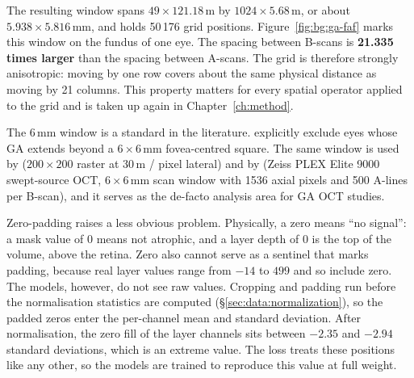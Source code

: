 The resulting window spans $49 \times 121.18$\,\textmu{}m by
$1024 \times 5.68$\,\textmu{}m, or about $5.938 \times 5.816$\,mm, and holds
50\,176 grid positions. Figure~\ref{fig:bg:ga-faf} marks this window on
the fundus of one eye. The spacing between B-scans is \textbf{21.335
times larger} than the spacing between A-scans. The grid is therefore strongly
anisotropic: moving by one row covers about the same physical distance
as moving by 21 columns. This property matters for every
spatial operator applied to the grid and is taken up again in
Chapter~\ref{ch:method}.

The 6\,mm window is a standard in the literature. \citet{Pilotto2015}
explicitly exclude eyes whose GA extends beyond a $6 \times 6$\,mm
fovea-centred square. The same window is used by \citet{Yehoshua2011}
($200 \times 200$ raster at 30\,\textmu{}m / pixel lateral) and by
\citet{Chu2022} (Zeiss PLEX Elite 9000 swept-source OCT, $6 \times 6$\,mm scan
window with 1536 axial pixels and 500 A-lines per B-scan), and it
serves as the de-facto analysis area for GA OCT studies.

Zero-padding raises a less obvious problem. Physically, a zero means
``no signal'': a mask value of 0 means not atrophic, and a layer depth
of 0 is the top of the volume, above the retina. Zero also cannot serve
as a sentinel that marks padding, because real layer values range from
$-14$ to $499$ and so include zero. The models, however, do not see raw
values. Cropping and padding run before the normalisation
statistics are computed (\S\ref{sec:data:normalization}), so the padded
zeros enter the per-channel mean and standard deviation. After
normalisation, the zero fill of the layer channels sits between $-2.35$
and $-2.94$ standard deviations, which is an extreme value. The loss
treats these positions like any other, so the models are trained to
reproduce this value at full weight.

